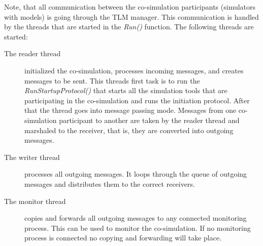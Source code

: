 Note, that all communication between the co-simulation participants (simulators with models) is going through the TLM manager. 
This communication is handled by the threads that are started in the {\em Run()} function. 
The following threads are started:
\begin{description}
\item[The reader thread] initialized the co-simulation, processes incoming messages, and creates messages to be sent. 
This threads first task is to run the {\em RunStartupProtocol()} that starts all the simulation tools that are participating in the co-simulation and runs the initiation protocol. 
After that the thread goes into message passing mode. 
Messages from one co-simulation participant to another are taken by the reader thread and marshaled to the receiver, that is, they are converted into outgoing messages.
\item[The writer thread] processes all outgoing messages. 
It loops through the queue of outgoing messages and distributes them to the correct receivers.
\item[The monitor thread] copies and forwards all outgoing messages to any connected monitoring process. 
This can be used to monitor the co-simulation. 
If no monitoring process is connected no copying and forwarding will take place.
\end{description}

